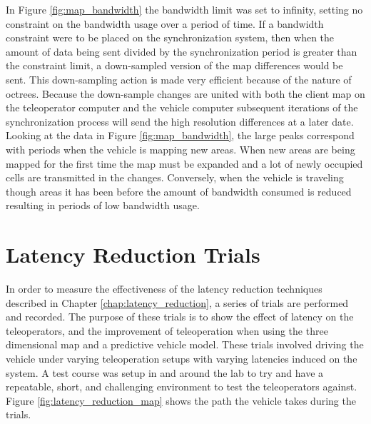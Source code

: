 \documentclass[12pt]{report}
\begin{document}
In Figure \ref{fig:map_bandwidth} the bandwidth limit was set to infinity, setting no constraint on the bandwidth usage over a period of time.  If a bandwidth constraint were to be placed on the synchronization system, then when the amount of data being sent divided by the synchronization period is greater than the constraint limit, a down-sampled version of the map differences would be sent.  This down-sampling action is made very efficient because of the nature of octrees.  Because the down-sample changes are united with both the client map on the teleoperator computer and the vehicle computer subsequent iterations of the synchronization process will send the high resolution differences at a later date.  Looking at the data in Figure \ref{fig:map_bandwidth}, the large peaks correspond with periods when the vehicle is mapping new areas.  When new areas are being mapped for the first time the map must be expanded and a lot of newly occupied cells are transmitted in the changes.  Conversely, when the vehicle is traveling though areas it has been before the amount of bandwidth consumed is reduced resulting in periods of low bandwidth usage.

\section{Latency Reduction Trials}\label{sec:latency_reduction_trials}
In order to measure the effectiveness of the latency reduction techniques described in Chapter \ref{chap:latency_reduction}, a series of trials are performed and recorded.  The purpose of these trials is to show the effect of latency on the teleoperators, and the improvement of teleoperation when using the three dimensional map and a predictive vehicle model.  These trials involved driving the vehicle under varying teleoperation setups with varying latencies induced on the system.  A test course was setup in and around the lab to try and have a repeatable, short, and challenging environment to test the teleoperators against.  Figure \ref{fig:latency_reduction_map} shows the path the vehicle takes during the trials.
\end{document}
